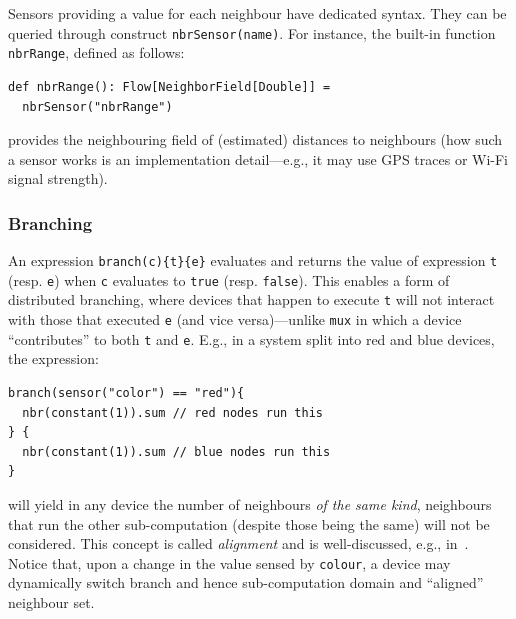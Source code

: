 Sensors providing a value for each neighbour have dedicated syntax.
%
They can be queried through construct \lstinline|nbrSensor(name)|.
%
For instance,
the built-in function \lstinline|nbrRange|, defined as follows:
\begin{lstlisting}
def nbrRange(): Flow[NeighborField[Double]] = 
  nbrSensor("nbrRange")
\end{lstlisting}
provides the neighbouring field of (estimated) distances to neighbours
(how such a sensor works is an implementation detail---e.g., it may use GPS traces or Wi-Fi signal strength).
%



\subsubsection{Branching}
%
An expression \lstinline|branch(c){t}{e}|
evaluates and returns the value of expression \texttt{t} (resp. \texttt{e})
when \texttt{c} evaluates to \lstinline|true| (resp. \lstinline|false|).
%
%
This enables a form of distributed branching,
where devices that happen to execute \texttt{t}
will not interact with those that executed \texttt{e} (and vice versa)---unlike \lstinline|mux| in which a device ``contributes'' to both \texttt{t} and \texttt{e}.
%
E.g.,
in a system split into red and blue devices, the expression:
\begin{lstlisting}
branch(sensor("color") == "red"){
  nbr(constant(1)).sum // red nodes run this
} { 
  nbr(constant(1)).sum // blue nodes run this
}
\end{lstlisting}
will yield in any device the number of neighbours \emph{of the same kind},
neighbours that run the other sub-computation
(despite those being the same) will not be considered.
%
This concept is called \emph{alignment} and is well-discussed, e.g., in~\cite{DBLP:journals/lmcs/AudritoCDV23}.
% 
Notice that, upon a change in the value sensed by \texttt{colour},
 a device may dynamically switch branch and hence sub-computation domain and ``aligned'' neighbour set.
 

